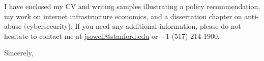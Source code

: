 \documentclass{letter}[12pt]
\begin{document}
\begin{letter}
I have enclosed my CV and writing samples illustrating a policy
recommendation, my work on internet infrastructure economics, and a
dissertation chapter on anti-abuse (cybersecurity).  If you need any additional information, please do not hesitate to
contact me at \href{mailto:jsowell@stanford.edu}{jsowell@stanford.edu}
or +1 (517) 214-1900.

\closing{Sincerely,}


\vspace{0.5in}


\end{letter}
\end{document}
